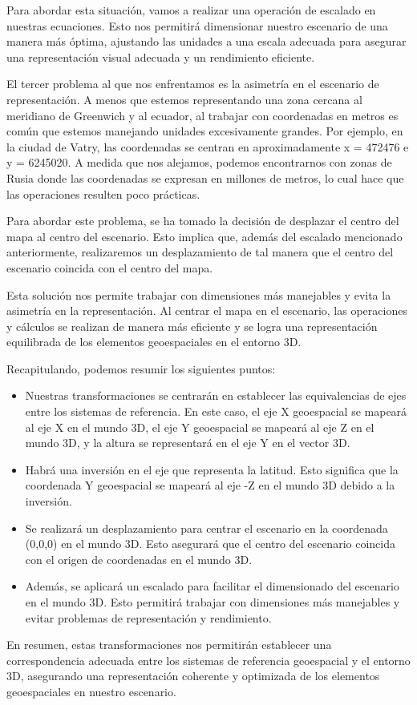 \documentclass[a4paper, 11pt]{book}
\begin{document}
Para abordar esta situación, vamos a realizar una operación de escalado en nuestras ecuaciones. Esto nos permitirá dimensionar nuestro escenario de una manera más óptima, ajustando las unidades a una escala adecuada para asegurar una representación visual adecuada y un rendimiento eficiente.

El tercer problema al que nos enfrentamos es la asimetría en el escenario de representación. A menos que estemos representando una zona cercana al meridiano de Greenwich y al ecuador, al trabajar con coordenadas en metros es común que estemos manejando unidades excesivamente grandes. Por ejemplo, en la ciudad de Vatry, las coordenadas se centran en aproximadamente x = 472476 e y = 6245020. A medida que nos alejamos, podemos encontrarnos con zonas de Rusia donde las coordenadas se expresan en millones de metros, lo cual hace que las operaciones resulten poco prácticas.

Para abordar este problema, se ha tomado la decisión de desplazar el centro del mapa al centro del escenario. Esto implica que, además del escalado mencionado anteriormente, realizaremos un desplazamiento de tal manera que el centro del escenario coincida con el centro del mapa.

Esta solución nos permite trabajar con dimensiones más manejables y evita la asimetría en la representación. Al centrar el mapa en el escenario, las operaciones y cálculos se realizan de manera más eficiente y se logra una representación equilibrada de los elementos geoespaciales en el entorno 3D.

Recapitulando, podemos resumir los siguientes puntos:
\begin{itemize}
    \item Nuestras transformaciones se centrarán en establecer las equivalencias de ejes entre los sistemas de referencia. En este caso, el eje X geoespacial se mapeará al eje X en el mundo 3D, el eje Y geoespacial se mapeará al eje Z en el mundo 3D, y la altura se representará en el eje Y en el vector 3D.
    \item Habrá una inversión en el eje que representa la latitud. Esto significa que la coordenada Y geoespacial se mapeará al eje -Z en el mundo 3D debido a la inversión.
    \item Se realizará un desplazamiento para centrar el escenario en la coordenada (0,0,0) en el mundo 3D. Esto asegurará que el centro del escenario coincida con el origen de coordenadas en el mundo 3D.
    \item Además, se aplicará un escalado para facilitar el dimensionado del escenario en el mundo 3D. Esto permitirá trabajar con dimensiones más manejables y evitar problemas de representación y rendimiento.
\end{itemize}
En resumen, estas transformaciones nos permitirán establecer una correspondencia adecuada entre los sistemas de referencia geoespacial y el entorno 3D, asegurando una representación coherente y optimizada de los elementos geoespaciales en nuestro escenario.
\end{document}

